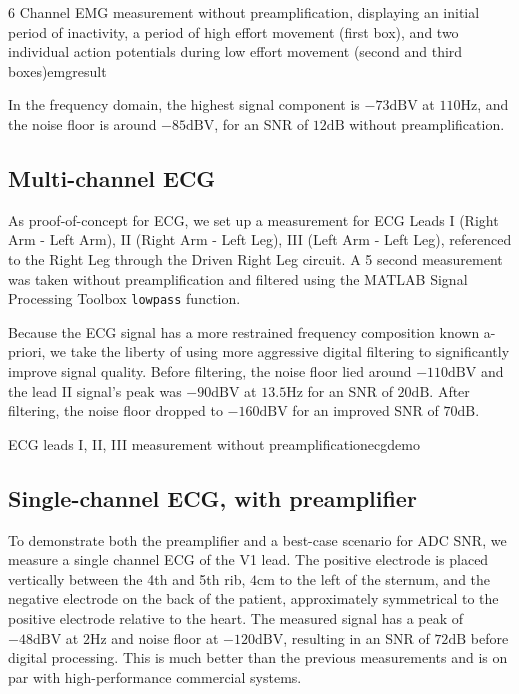 \documentclass{thesis}
\newcommand{\Hz}{\unit{\hertz}}
\newcommand{\cm}{\unit{\centi\meter}}
\newcommand{\dB}{\unit{\deci\bel}}
\newcommand{\dBV}{\unit{\deci\bel\volt}}
\begin{document}
\begin{thesisfigure}{6 Channel EMG measurement without preamplification, displaying an initial period of inactivity, a period of high effort movement (first box), and two individual action potentials during low effort movement (second and third boxes)}{emgresult}

\end{thesisfigure}

In the frequency domain, the highest signal component is $-73\dBV$ at $110\Hz$, and the noise floor is around $-85\dBV$, for an SNR of $12\dB$ without preamplification.

\subsection*{Multi-channel ECG}

As proof-of-concept for ECG, we set up a measurement for ECG Leads I (Right Arm - Left Arm), II (Right Arm - Left Leg), III (Left Arm - Left Leg), referenced to the Right Leg through the Driven Right Leg circuit. A 5 second measurement was taken without preamplification and filtered using the MATLAB Signal Processing Toolbox \texttt{lowpass} function.

Because the ECG signal has a more restrained frequency composition known a-priori, we take the liberty of using more aggressive digital filtering to significantly improve signal quality. Before filtering, the noise floor lied around $-110\dBV$ and the lead II signal's peak was $-90\dBV$ at $13.5\Hz$ for an SNR of $20\dB$. After filtering, the noise floor dropped to $-160\dBV$ for an improved SNR of $70\dB$.

\begin{thesisfigure}{ECG leads I, II, III measurement without preamplification}{ecgdemo}

\end{thesisfigure}

\subsection*{Single-channel ECG, with preamplifier}

To demonstrate both the preamplifier and a best-case scenario for ADC SNR, we measure a single channel ECG of the V1 lead. The positive electrode is placed vertically between the 4th and 5th rib, $4\cm$ to the left of the sternum, and the negative electrode on the back of the patient, approximately symmetrical to the positive electrode relative to the heart. The measured signal has a peak of $-48\dBV$ at $2\Hz$ and noise floor at $-120\dBV$, resulting in an SNR of $72\dB$ before digital processing. This is much better than the previous measurements and is on par with high-performance commercial systems.
\end{document}
